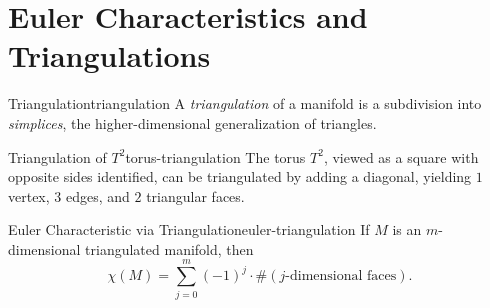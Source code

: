 
\section{Euler Characteristics and Triangulations}

\begin{definition}{Triangulation}{triangulation}
    A \emph{triangulation} of a manifold is a subdivision into \emph{simplices}, the higher-dimensional generalization of triangles.
\end{definition}

\begin{example}{Triangulation of $T^2$}{torus-triangulation}
    The torus $T^2$, viewed as a square with opposite sides identified, can be triangulated by adding a diagonal, yielding $1$ vertex, $3$ edges, and $2$ triangular faces.
\end{example}

\begin{center}
\end{center}

\begin{theorem}{Euler Characteristic via Triangulation}{euler-triangulation}
    If $M$ is an $m$-dimensional triangulated manifold, then
    \[
        \chi(M) = \sum_{j=0}^{m} (-1)^j \cdot \#(j\text{-dimensional faces}).
    \]
\end{theorem}

